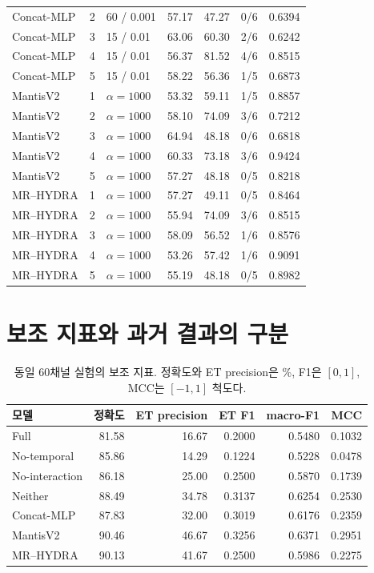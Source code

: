 \documentclass[11pt,a4paper]{article}
\numberwithin{equation}{section}
\begin{document}
\begin{longtable}{@{}lclrrrr@{}}
Concat-MLP & 2 & 60 / 0.001 & 57.17 & 47.27 & 0/6 & 0.6394 \\
Concat-MLP & 3 & 15 / 0.01 & 63.06 & 60.30 & 2/6 & 0.6242 \\
Concat-MLP & 4 & 15 / 0.01 & 56.37 & 81.52 & 4/6 & 0.8515 \\
Concat-MLP & 5 & 15 / 0.01 & 58.22 & 56.36 & 1/5 & 0.6873 \\
MantisV2 & 1 & $\alpha=1000$ & 53.32 & 59.11 & 1/5 & 0.8857 \\
MantisV2 & 2 & $\alpha=1000$ & 58.10 & 74.09 & 3/6 & 0.7212 \\
MantisV2 & 3 & $\alpha=1000$ & 64.94 & 48.18 & 0/6 & 0.6818 \\
MantisV2 & 4 & $\alpha=1000$ & 60.33 & 73.18 & 3/6 & 0.9424 \\
MantisV2 & 5 & $\alpha=1000$ & 57.27 & 48.18 & 0/5 & 0.8218 \\
MR--HYDRA & 1 & $\alpha=1000$ & 57.27 & 49.11 & 0/5 & 0.8464 \\
MR--HYDRA & 2 & $\alpha=1000$ & 55.94 & 74.09 & 3/6 & 0.8515 \\
MR--HYDRA & 3 & $\alpha=1000$ & 58.09 & 56.52 & 1/6 & 0.8576 \\
MR--HYDRA & 4 & $\alpha=1000$ & 53.26 & 57.42 & 1/6 & 0.9091 \\
MR--HYDRA & 5 & $\alpha=1000$ & 55.19 & 48.18 & 0/5 & 0.8982 \\
\end{longtable}
\normalsize

\section{보조 지표와 과거 결과의 구분}
\begin{table}[H]\centering\small
\caption{동일 60채널 실험의 보조 지표. 정확도와 ET precision은 \%,
F1은 $[0,1]$, MCC는 $[-1,1]$ 척도다.}
\begin{tabular}{@{}lrrrrr@{}}\toprule
 모델 & 정확도 & ET precision & ET F1 & macro-F1 & MCC\\\midrule
Full & 81.58 & 16.67 & 0.2000 & 0.5480 & 0.1032 \\
No-temporal & 85.86 & 14.29 & 0.1224 & 0.5228 & 0.0478 \\
No-interaction & 86.18 & 25.00 & 0.2500 & 0.5870 & 0.1739 \\
Neither & 88.49 & 34.78 & 0.3137 & 0.6254 & 0.2530 \\
Concat-MLP & 87.83 & 32.00 & 0.3019 & 0.6176 & 0.2359 \\
MantisV2 & 90.46 & 46.67 & 0.3256 & 0.6371 & 0.2951 \\
MR--HYDRA & 90.13 & 41.67 & 0.2500 & 0.5986 & 0.2275 \\
\bottomrule\end{tabular}
\end{table}
\end{document}
